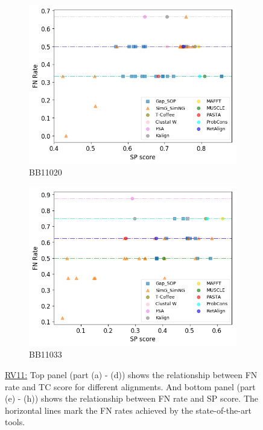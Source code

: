 \begin{figure}[!htbp]
\begin{adjustwidth}{-1cm}{-1cm}
\begin{subfigure}{0.22\textwidth}
			\includegraphics[width=\columnwidth]{Figure/summary/precomputedInit/Balibase/BB11020_fnrate_vs_sp_2}
			\caption{BB11020}
		\end{subfigure}
		\begin{subfigure}{0.22\textwidth}
			\includegraphics[width=\columnwidth]{Figure/summary/precomputedInit/Balibase/BB11033_fnrate_vs_sp_2}
			\caption{BB11033}
		\end{subfigure}	
		\caption{\underline{RV11:} Top panel (part (a) - (d)) shows the relationship between FN rate and TC score for different alignments. And bottom panel (part (e) - (h)) shows the relationship between FN rate and SP score. The horizontal lines mark the FN rates achieved by the state-of-the-art tools.}
		\label{fig:rv11_fnrate_vs_tc}
	\end{adjustwidth}
\end{figure}
